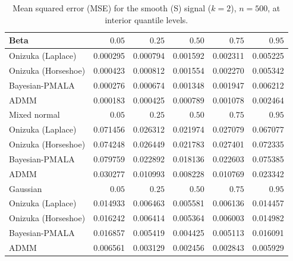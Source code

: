 \begin{table}[!htbp]
\centering
\small
\caption{Mean squared error (MSE) for the smooth (S) signal ($k=2$), $n=500$, at interior quantile levels.}
\label{tab:s_int_mse}
\begin{tabular}{lrrrrr}
\toprule
Beta & $0.05$ & $0.25$ & $0.50$ & $0.75$ & $0.95$ \\
\midrule
Onizuka (Laplace) & 0.000295 & 0.000794 & 0.001592 & 0.002311 & 0.005225 \\
Onizuka (Horseshoe) & 0.000423 & 0.000812 & 0.001554 & 0.002270 & 0.005342 \\
Bayesian-PMALA & 0.000276 & 0.000674 & 0.001348 & 0.001947 & 0.006212 \\
ADMM & 0.000183 & 0.000425 & 0.000789 & 0.001078 & 0.002464 \\
\midrule
Mixed normal & $0.05$ & $0.25$ & $0.50$ & $0.75$ & $0.95$ \\
\midrule
Onizuka (Laplace) & 0.071456 & 0.026312 & 0.021974 & 0.027079 & 0.067077 \\
Onizuka (Horseshoe) & 0.074248 & 0.026449 & 0.021783 & 0.027401 & 0.072335 \\
Bayesian-PMALA & 0.079759 & 0.022892 & 0.018136 & 0.022603 & 0.075385 \\
ADMM & 0.030277 & 0.010993 & 0.008228 & 0.010769 & 0.023342 \\
\midrule
Gaussian & $0.05$ & $0.25$ & $0.50$ & $0.75$ & $0.95$ \\
\midrule
Onizuka (Laplace) & 0.014933 & 0.006463 & 0.005581 & 0.006136 & 0.014457 \\
Onizuka (Horseshoe) & 0.016242 & 0.006414 & 0.005364 & 0.006003 & 0.014982 \\
Bayesian-PMALA & 0.016857 & 0.005419 & 0.004425 & 0.005113 & 0.016091 \\
ADMM & 0.006561 & 0.003129 & 0.002456 & 0.002843 & 0.005929 \\
\bottomrule
\end{tabular}
\end{table}

